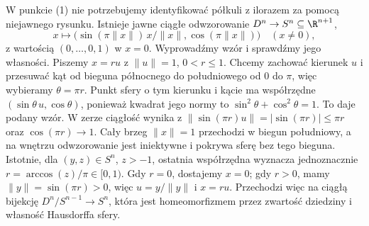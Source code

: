 \begin{uwaga}
\label{rem:iloraz-dysku-sfera}
W punkcie (1) nie potrzebujemy
identyfikować półkuli z ilorazem
za pomocą niejawnego rysunku.
Istnieje jawne ciągłe odwzorowanie
$D^n\to S^n\subseteq\R^{n+1}$,
\[
 x\longmapsto
 \bigl(\sin(\pi\|x\|)\,x/\|x\|,
       \cos(\pi\|x\|)\bigr)
 \quad(x\ne0),
\]
z wartością $(0,\ldots,0,1)$
w $x=0$. Wyprowadźmy wzór i sprawdźmy jego własności.
Piszemy $x=ru$ z $\|u\|=1$, $0<r\leq1$.
Chcemy zachować kierunek $u$ i przesuwać kąt od bieguna
północnego do południowego od $0$ do $\pi$, więc wybieramy
$\theta=\pi r$. Punkt sfery o tym kierunku i kącie ma
współrzędne $(\sin\theta\,u,\cos\theta)$, ponieważ
kwadrat jego normy to $\sin^2\theta+\cos^2\theta=1$.
To daje podany wzór. W zerze ciągłość wynika z
$\|\sin(\pi r)u\|=|\sin(\pi r)|\leq\pi r$ oraz $\cos(\pi r)\to1$.
Cały brzeg $\|x\|=1$
przechodzi w biegun południowy,
a na wnętrzu odwzorowanie jest iniektywne
i pokrywa sferę bez tego bieguna.
Istotnie, dla $(y,z)\in S^n$, $z>-1$,
ostatnia współrzędna wyznacza jednoznacznie
$r=\arccos(z)/\pi\in[0,1)$.
Gdy $r=0$, dostajemy $x=0$; gdy $r>0$, mamy
$\|y\|=\sin(\pi r)>0$, więc $u=y/\|y\|$ i $x=ru$.
Przechodzi więc na ciągłą bijekcję
$D^n/S^{n-1}\to S^n$, która jest
homeomorfizmem przez zwartość
dziedziny i własność Hausdorffa
sfery.
\end{uwaga}

